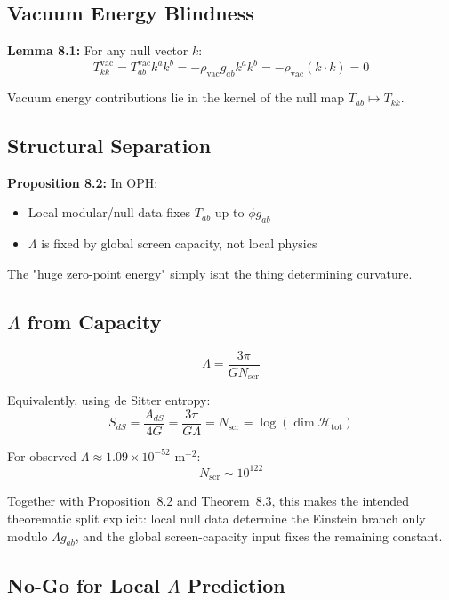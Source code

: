 \subsection{Vacuum Energy Blindness}\label{81-vacuum-energy-blindness}

\textbf{Lemma 8.1:} For any null vector \(k\): \[T^{\text{vac}}_{kk} = T^{\text{vac}}_{ab} k^a k^b = -\rho_{\text{vac}} g_{ab} k^a k^b = -\rho_{\text{vac}}(k \cdot k) = 0\]

Vacuum energy contributions lie in the kernel of the null map \(T_{ab} \mapsto T_{kk}\).

\subsection{Structural Separation}\label{82-structural-separation}

\textbf{Proposition 8.2:} In OPH:

\begin{itemize}
\tightlist
\item
 Local modular/null data fixes \(T_{ab}\) up to \(\phi g_{ab}\)
\item
 \(\Lambda\) is fixed by global screen capacity, not local physics
\end{itemize}

The "huge zero-point energy" simply isn\textquotesingle t the thing determining curvature.

\subsection{\texorpdfstring{\(\Lambda\) from Capacity}{Lambda from Capacity}}\label{83-ux3bb-from-capacity}

\[\Lambda = \frac{3\pi}{G N_{\mathrm{scr}}}\]

Equivalently, using de Sitter entropy: \[S_{dS} = \frac{A_{dS}}{4G} = \frac{3\pi}{G\Lambda} = N_{\mathrm{scr}} = \log(\dim \mathcal{H}_{\text{tot}})\]

For observed \(\Lambda \approx 1.09 \times 10^{-52}\) m\(^{-2}\): \[N_{\mathrm{scr}} \sim 10^{122}\]

Together with Proposition~8.2 and Theorem~8.3, this makes the intended theorematic split explicit: local null data determine the Einstein branch only modulo \(\Lambda g_{ab}\), and the global screen-capacity input fixes the remaining constant.

\subsection{\texorpdfstring{No-Go for Local \(\Lambda\) Prediction}{No-Go for Local Lambda Prediction}}\label{84-no-go-for-local-ux3bb-prediction}

